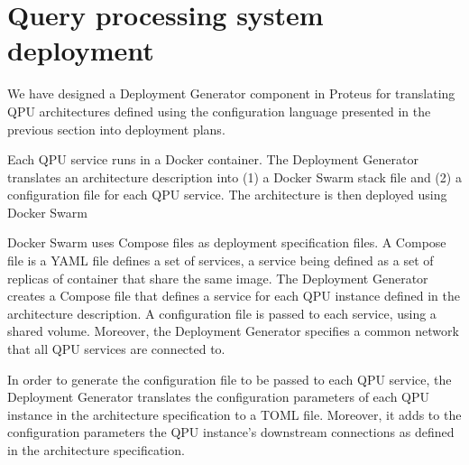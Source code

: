 \section{Query processing system deployment}
\label{sec:proteus_deployment}

We have designed a Deployment Generator component in Proteus for translating QPU architectures defined using the configuration
language presented in the previous section into deployment plans.

Each QPU service runs in a Docker \cite{docker} container.
The Deployment Generator translates an architecture description into (1) a Docker Swarm stack file
and (2) a configuration file for each QPU service.
The architecture is then deployed using Docker Swarm \cite{docker:swarm}

Docker Swarm uses Compose files \cite{docker:composefile} as deployment specification files.
A Compose file is a YAML \cite{yaml} file defines a set of services, a service being defined as a set of replicas of container that share the same image.
The Deployment Generator creates a Compose file that defines a service for each QPU instance defined in the architecture description.
A configuration file is passed to each service, using a shared volume.
Moreover, the Deployment Generator specifies a common network that all QPU services are connected to.

In order to generate the configuration file to be passed to each QPU service, the Deployment Generator translates the configuration parameters
of each QPU instance in the architecture specification to a TOML \cite{toml} file.
Moreover, it adds to the configuration parameters the QPU instance's downstream connections as defined in the architecture specification.



